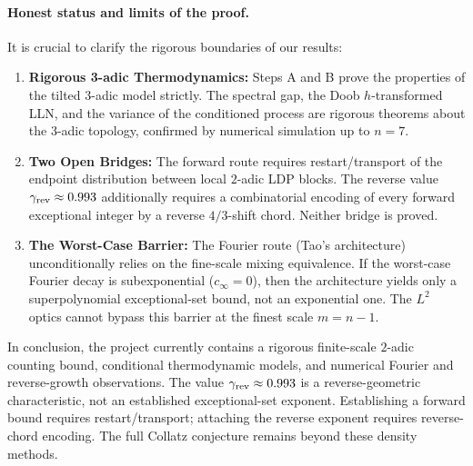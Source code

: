 \documentclass[12pt,a4paper]{article}
\begin{document}
\paragraph{Honest status and limits of the proof.}
It is crucial to clarify the rigorous boundaries of our results:
\begin{enumerate}
\item \textbf{Rigorous 3-adic Thermodynamics:} Steps A and B prove the properties of the tilted 3-adic model strictly. The spectral gap, the Doob $h$-transformed LLN, and the variance of the conditioned process are rigorous theorems about the 3-adic topology, confirmed by numerical simulation up to $n=7$.
\item \textbf{Two Open Bridges:} The forward route requires restart/transport of the endpoint distribution between local $2$-adic LDP blocks. The reverse value $\gamma_{\rm rev}\approx0.993$ additionally requires a combinatorial encoding of every forward exceptional integer by a reverse $4/3$-shift chord. Neither bridge is proved.
\item \textbf{The Worst-Case Barrier:} The Fourier route (Tao's architecture) unconditionally relies on the fine-scale mixing equivalence. If the worst-case Fourier decay is subexponential ($c_\infty = 0$), then the architecture yields only a superpolynomial exceptional-set bound, not an exponential one. The $L^2$ optics cannot bypass this barrier at the finest scale $m=n-1$.
\end{enumerate}

In conclusion, the project currently contains a rigorous finite-scale $2$-adic counting bound, conditional thermodynamic models, and numerical Fourier and reverse-growth observations.  The value $\gamma_{\rm rev}\approx0.993$ is a reverse-geometric characteristic, not an established exceptional-set exponent.  Establishing a forward bound requires restart/transport; attaching the reverse exponent requires reverse-chord encoding.  The full Collatz conjecture remains beyond these density methods.
\end{document}
